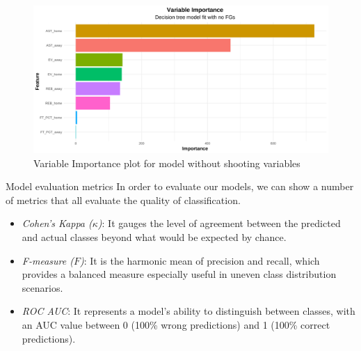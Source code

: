 \documentclass[
  ignorenonframetext,
]{beamer}
\begin{document}
\begin{frame}
\begin{figure}

{\centering \includegraphics[width=1\linewidth]{latex/plotspres/plot_10} 

}

\caption{Variable Importance plot for model without shooting variables}\label{fig:vipnofg}
\end{figure}
\end{frame}

\begin{frame}{Model evaluation metrics}
\protect\hypertarget{model-evaluation-metrics}{}
In order to evaluate our models, we can show a number of metrics that
all evaluate the quality of classification.

\begin{itemize}
\item
  \emph{Cohen's Kappa (\(\kappa\))}: It gauges the level of agreement
  between the predicted and actual classes beyond what would be expected
  by chance.
\item
  \emph{F-measure (\(F\))}: It is the harmonic mean of precision and
  recall, which provides a balanced measure especially useful in uneven
  class distribution scenarios.
\item
  \emph{ROC AUC}: It represents a model's ability to distinguish between
  classes, with an AUC value between 0 (100\% wrong predictions) and 1
  (100\% correct predictions).
\end{itemize}
\end{frame}
\end{document}
